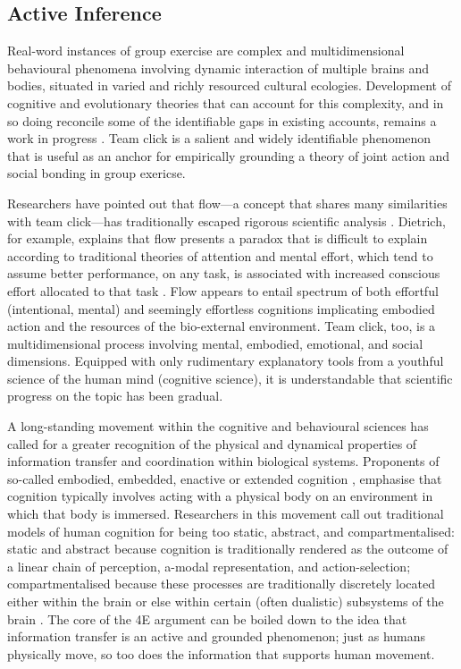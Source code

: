 \begin{CJK}{UTF8}{gbsn}
\section{Active Inference \label{sect:activeIn}}

Real-word instances of group exercise are complex and multidimensional behavioural phenomena involving dynamic interaction of multiple brains and bodies, situated in varied and richly resourced cultural ecologies.  Development of cognitive and evolutionary theories that can account for this complexity, and in so doing reconcile some of the identifiable gaps in existing accounts, remains a work in progress \citep{Fuentes2016}.  Team click is a salient and widely identifiable phenomenon that is useful as an anchor for empirically grounding a theory of joint action and social bonding in group exericse.

Researchers have pointed out that flow---a concept that shares many similarities with team click---has traditionally escaped rigorous scientific analysis \citep{Dietrich2010a,Slingerland2014}.  Dietrich, for example, explains that flow presents a paradox that is difficult to explain according to traditional theories of attention and mental effort, which tend to assume better performance, on any task, is associated with increased conscious effort allocated to that task \citep{Dietrich2004b}.  Flow appears to entail spectrum of both effortful (intentional, mental) and seemingly effortless cognitions implicating embodied action and the resources of the bio-external environment.  Team click, too, is a multidimensional process involving mental, embodied, emotional, and social dimensions.  Equipped with only rudimentary explanatory tools from a youthful science of the human mind (cognitive science), it is understandable that scientific progress on the topic has been gradual.

A long-standing movement within the cognitive and behavioural sciences has called for a greater recognition of the physical and dynamical properties of information transfer and coordination within biological systems.  Proponents of so-called embodied, embedded, enactive or extended cognition \citep[now collectively referred to as ``4E cognition,'' see][]{Menary2010}, emphasise that cognition typically involves acting with a physical body on an environment in which that body is immersed.  Researchers in this movement call out traditional models of human cognition for being too static, abstract, and compartmentalised: static and abstract because cognition is traditionally rendered as the outcome of a linear chain of perception, a-modal representation, and action-selection; compartmentalised because these processes are traditionally discretely located either within the brain or else within certain (often dualistic) subsystems of the brain \citep[e.g., emotional and cognitive, System 1 (fast) and System 2 (slow), implicit and explicit, and so on; cf.][]{Dienes1999,Evans2003,Kahneman2011}.  The core of the 4E argument can be boiled down to the idea that information transfer is an active and grounded phenomenon; just as humans physically move, so too does the information that supports human movement.


\end{CJK}
